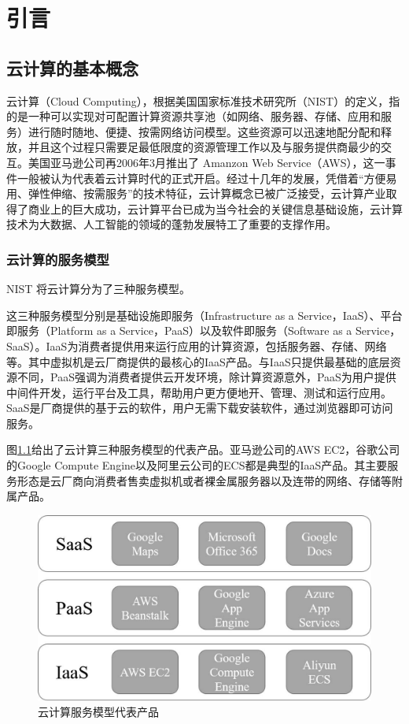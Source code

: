 
\chapter{引言}

\section{云计算的基本概念}

云计算（Cloud Computing），根据美国国家标准技术研究所（NIST）的定义，指的是一种可以实现对可配置计算资源共享池（如网络、服务器、存储、应用和服务）进行随时随地、便捷、按需网络访问模型。这些资源可以迅速地配分配和释放，并且这个过程只需要足最低限度的资源管理工作以及与服务提供商最少的交互。美国亚马逊公司再2006年3月推出了 Amanzon Web Service（AWS），这一事件一般被认为代表着云计算时代的正式开启。经过十几年的发展，凭借着“方便易用、弹性伸缩、按需服务”的技术特征，云计算概念已被广泛接受，云计算产业取得了商业上的巨大成功，云计算平台已成为当今社会的关键信息基础设施，云计算技术为大数据、人工智能的领域的蓬勃发展特工了重要的支撑作用。

\subsection{云计算的服务模型}

NIST 将云计算分为了三种服务模型。

这三种服务模型分别是基础设施即服务（Infrastructure as a Service，IaaS）、平台即服务（Platform as a Service，PaaS）以及软件即服务（Software as a Service，SaaS）。IaaS为消费者提供用来运行应用的计算资源，包括服务器、存储、网络等。其中虚拟机是云厂商提供的最核心的IaaS产品。与IaaS只提供最基础的底层资源不同，PaaS强调为消费者提供云开发环境，除计算资源意外，PaaS为用户提供中间件开发，运行平台及工具，帮助用户更方便地开、管理、测试和运行应用。SaaS是厂商提供的基于云的软件，用户无需下载安装软件，通过浏览器即可访问服务。

图\ref{rep_products}给出了云计算三种服务模型的代表产品。亚马逊公司的AWS EC2，谷歌公司的Google Compute Engine以及阿里云公司的ECS都是典型的IaaS产品。其主要服务形态是云厂商向消费者售卖虚拟机或者裸金属服务器以及连带的网络、存储等附属产品。

\begin{figure}
    \centerline{\includegraphics[width=\textwidth]{figures/rep_products.jpg}}
    \caption{云计算服务模型代表产品}
    \label{rep_products}
\end{figure}

